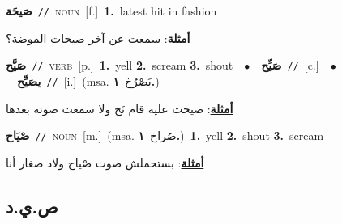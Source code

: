 \documentclass[10pt,a4paper,twoside]{article} %
\begin{document}
\begin{multicols}{2}
{\setlength\topsep{0pt}\textbf{\foreignlanguage{arabic}{صَيحَة}}\ {\color{gray}\texttt{//}\color{black}}\ \textsc{noun}\ [f.]\ \textbf{1.}~latest hit in fashion\  \begin{flushright}\color{gray}\foreignlanguage{arabic}{\textbf{\underline{\foreignlanguage{arabic}{أمثلة}}}: سمعت عن آخر صيحات الموضة؟}\end{flushright}\color{black}} \vspace{2mm}

{\setlength\topsep{0pt}\textbf{\foreignlanguage{arabic}{صَيَّح}}\ {\color{gray}\texttt{//}\color{black}}\ \textsc{verb}\ [p.]\ \textbf{1.}~yell  \textbf{2.}~scream  \textbf{3.}~shout\ \ $\bullet$\ \ \setlength\topsep{0pt}\textbf{\foreignlanguage{arabic}{صَيِّح}}\ {\color{gray}\texttt{//}\color{black}}\ [c.]\ \ $\bullet$\ \ \setlength\topsep{0pt}\textbf{\foreignlanguage{arabic}{يصَيِّح}}\ {\color{gray}\texttt{//}\color{black}}\ [i.]\ \color{gray}(msa. \foreignlanguage{arabic}{يَصْرُخ}~\foreignlanguage{arabic}{\textbf{١.}})\color{black}\  \begin{flushright}\color{gray}\foreignlanguage{arabic}{\textbf{\underline{\foreignlanguage{arabic}{أمثلة}}}: صيحت عليه قام نَخ ولا سمعت صوته بعدها}\end{flushright}\color{black}} \vspace{2mm}

{\setlength\topsep{0pt}\textbf{\foreignlanguage{arabic}{صْيَاح}}\ {\color{gray}\texttt{//}\color{black}}\ \textsc{noun}\ [m.]\ \color{gray}(msa. \foreignlanguage{arabic}{صُراخ}~\foreignlanguage{arabic}{\textbf{١.}})\color{black}\ \textbf{1.}~yell  \textbf{2.}~shout  \textbf{3.}~scream\  \begin{flushright}\color{gray}\foreignlanguage{arabic}{\textbf{\underline{\foreignlanguage{arabic}{أمثلة}}}: بستحملش صوت صْياح ولاد صغار أنا}\end{flushright}\color{black}} \vspace{2mm}

\vspace{-3mm}
\subsection*{\color{blue}\foreignlanguage{arabic}{ص.ي.د}\color{blue}{}} 


\end{multicols}
\end{document}
